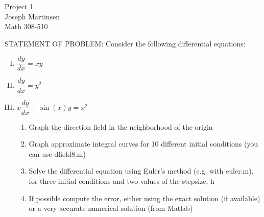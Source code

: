 \documentclass[a4paper,12pt]{article}
\newenvironment{nscenter}
 {\parskip=0pt\par\nopagebreak\centering}
 {\par\noindent\ignorespacesafterend}
\begin{document}
\begin{nscenter}
  Project 1 \\
  Joseph Martinsen \\
  Math 308-510 \vspace{35pt}
\end{nscenter}
STATEMENT OF PROBLEM: Consider the following differential equations:

\begin{enumerate}[I.]
  \item $\dfrac{dy}{dx} = xy$
  \item $\dfrac{dy}{dx} = y^2$
  \item $x \dfrac{dy}{dx} + \sin(x)y = x^2$
  \begin{enumerate}[1.]
    \item Graph the direction field in the neighborhood of the origin
    \item Graph approximate integral curves for 10 different initial conditions (you can use dfield8.m)
    \item Solve the differential equation using Euler's method (e.g. with euler.m), for three initial conditions and two values of the stepsize, h
    \item If possible compute the error, either using the exact solution (if available) or a very accurate numerical solution (from Matlab)
  \end{enumerate}
\end{enumerate}
\end{document}
